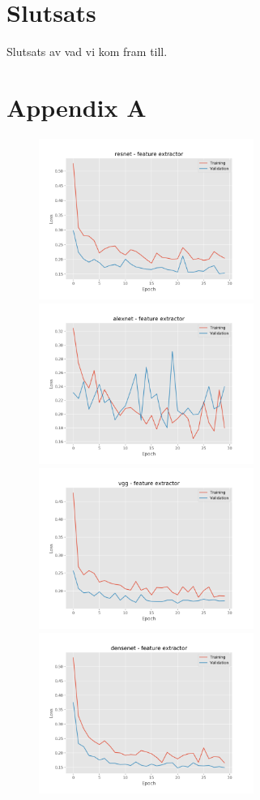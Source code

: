 \documentclass[]{kththesis}
\begin{document}
\chapter{Slutsats}  
Slutsats av vad vi kom fram till.

\printbibliography[heading=bibintoc]
\appendix
  \chapter{Appendix A}
  
  \begin{figure}[h]
    \includegraphics[width=7cm]{b_l_resnet_fe}
    \includegraphics[width=7cm]{b_l_alexnet_fe}
    \includegraphics[width=7cm]{b_l_vgg_fe}
    \includegraphics[width=7cm]{b_l_densenet_fe}

\end{figure}
\end{document}
